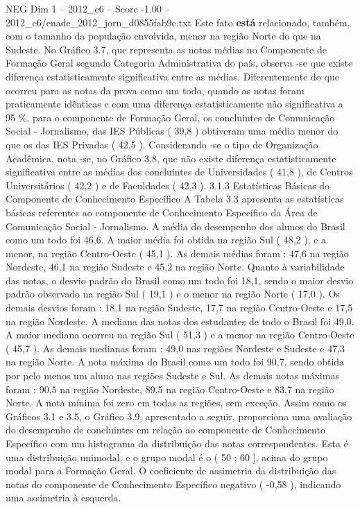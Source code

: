 \begin{textsample}{NEG Dim 1 – 2012\_c6 – Score -1.00 – 2012\_c6/enade\_2012\_jorn\_d0855fab9c.txt}
Este fato \textbf{está} relacionado, também, com o tamanho da população envolvida, menor na região Norte do que na Sudeste.
No Gráfico 3.7, que representa as notas médias no Componente de Formação Geral segundo Categoria Administrativa do país, observa -se que existe diferença estatisticamente significativa entre as médias.
Diferentemente do que ocorreu para as notas da prova como um todo, quando as notas foram praticamente idênticas e com uma diferença estatisticamente não significativa a 95 \%, para o componente de Formação Geral, os concluintes de Comunicação Social - Jornalismo, das IES Públicas ( 39,8 ) obtiveram uma média menor do que os das IES Privadas ( 42,5 ).
Considerando -se o tipo de Organização Acadêmica, nota -se, no Gráfico 3.8, que não existe diferença estatisticamente significativa entre as médias dos concluintes de Universidades ( 41,8 ), de Centros Universitários ( 42,2 ) e de Faculdades ( 42,3 ). 3.1.3 Estatísticas Básicas do Componente de Conhecimento Específico A Tabela 3.3 apresenta as estatísticas básicas referentes ao componente de Conhecimento Específico da Área de Comunicação Social - Jornalismo.
A média do desempenho dos alunos do Brasil como um todo foi 46,6.
A maior média foi obtida na região Sul ( 48,2 ), e a menor, na região Centro-Oeste ( 45,1 ).
As demais médias foram : 47,6 na região Nordeste, 46,1 na região Sudeste e 45,2 na região Norte.
Quanto à variabilidade das notas, o desvio padrão do Brasil como um todo foi 18,1, sendo o maior desvio padrão observado na região Sul ( 19,1 ) e o menor na região Norte ( 17,0 ).
Os demais desvios foram : 18,1 na região Sudeste, 17,7 na região Centro-Oeste e 17,5 na região Nordeste.
A mediana das notas dos estudantes de todo o Brasil foi 49,0.
A maior mediana ocorreu na região Sul ( 51,3 ) e a menor na região Centro-Oeste ( 45,7 ).
As demais medianas foram : 49,0 nas regiões Nordeste e Sudeste e 47,3 na região Norte.
A nota máxima do Brasil como um todo foi 90,7, sendo obtida por pelo menos um aluno nas regiões Sudeste e Sul.
As demais notas máximas foram : 90,5 na região Nordeste, 89,5 na região Centro-Oeste e 83,7 na região Norte.
A nota mínima foi zero em todas as regiões, sem exceção.
Assim como os Gráficos 3.1 e 3.5, o Gráfico 3.9, apresentado a seguir, proporciona uma avaliação do desempenho de concluintes em relação ao componente de Conhecimento Específico com um histograma da distribuição das notas correspondentes.
Esta é uma distribuição unimodal, e o grupo modal é o ( 50 ; 60 ], acima do grupo modal para a Formação Geral.
O coeficiente de assimetria da distribuição das notas do componente de Conhecimento Específico negativo ( -0,58 ), indicando uma assimetria à esquerda.

\end{textsample}

